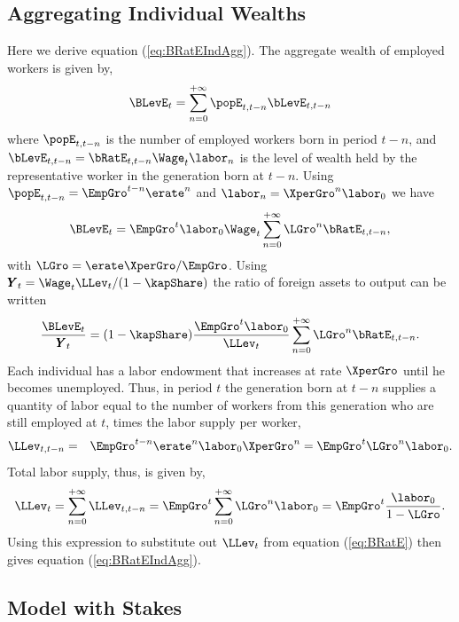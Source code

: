 \documentclass[titlepage]{\econtex}\newcommand{\texname}{cjSOE}
\renewcommand{\GDPLev}{\ensuremath{\pmb{Y}}}
\begin{document}
\subsection{Aggregating Individual Wealths}

Here we derive equation (\ref{eq:BRatEIndAgg}). The aggregate wealth of employed workers is given by,
\begin{equation*}
\BLevE_t=\sum_{n=0}^{+\infty} \popE_{t,t-n} \bLevE_{t,t-n}
\end{equation*}
where $\popE_{t,t-n}$ is the number of employed workers born in period $t-n$, and
$\bLevE_{t,t-n}=\bRatE_{t,t-n}\Wage_t \labor_{n}$ is the level of wealth held by the representative worker in the generation born at $t-n$. Using $\popE_{t,t-n}=\EmpGro^{t-n}\erate^{n}$ and $\labor_{n}=\XperGro^{n}\labor_0$ we have
\begin{equation*}
\BLevE_t = \EmpGro^t \labor_0 \Wage_t
\sum_{n=0}^{+\infty}\LGro^{n} \bRatE_{t,t-n},
\end{equation*}
with $\LGro = \erate \XperGro / \EmpGro$.
Using $\GDPLev_t=\Wage_t \LLev_t/(1-\kapShare)$ the ratio of foreign assets to output can be written
\begin{equation}
\frac{\BLevE_t}{\GDPLev_t}=(1-\kapShare) \frac{\EmpGro^t \labor_0} {\LLev_t} \sum_{n=0}^{+\infty}\LGro^{n} \bRatE_{t,t-n}.
\label{eq:BRatE}
\end{equation}
Each individual has a labor endowment that increases at rate $\XperGro$ until he becomes unemployed. Thus, in period $t$ the generation born at $t-n$ supplies a quantity of labor equal to the number of workers from this generation who are still employed at $t$, times the labor supply per worker,
\begin{eqnarray*}
\LLev_{t,t-n} & = & \EmpGro^{t-n}\erate^{n} \labor_0 \XperGro^{n}
= \EmpGro^{t} \LGro^{n}\labor_0 .
\end{eqnarray*}
Total labor supply, thus, is given by,
\begin{equation}
\LLev_t  =  \sum_{n=0}^{+\infty}\LLev_{t,t-n}  = \EmpGro^{t} \sum_{n=0}^{+\infty} \LGro^{n} \labor_0
=\EmpGro^{t} \frac{\labor_0}{1-\LGro}.
\label{eq:LLev}
\end{equation}
Using this expression to substitute out $\LLev_t$ from equation (\ref{eq:BRatE}) then gives equation  (\ref{eq:BRatEIndAgg}).

\subsection{Model with Stakes}
\end{document}
